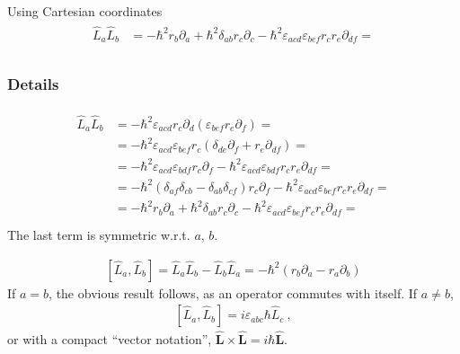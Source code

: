 \documentclass[letterpaper,10pt,english]{jupyterBook}
\begin{document}
\sphinxAtStartPar
{} Using Cartesian coordinates
\begin{equation*}
\begin{split}\begin{aligned}
  \hat{L}_a \hat{L}_b 
  & = - \hbar^2 r_b \partial_a + \hbar^2 \delta_{ab} r_c \partial_c - \hbar^2 \varepsilon_{acd} \varepsilon_{bef} r_c r_e \partial_{df} = \\
\end{aligned}\end{split}
\end{equation*}\subsubsection*{Details}
\begin{equation*}
\begin{split}\begin{aligned}
  \hat{L}_a \hat{L}_b 
  & = - \hbar^2 \varepsilon_{acd} r_c \partial_d \left( \varepsilon_{bef} r_e \partial_f \right) = \\
  & = - \hbar^2 \varepsilon_{acd} \varepsilon_{bef} r_c \left( \delta_{de} \partial_f + r_e \partial_{df} \right) = \\
  & = - \hbar^2 \varepsilon_{acd} \varepsilon_{bdf} r_c \partial_f - \hbar^2 \varepsilon_{acd} \varepsilon_{bdf} r_c r_e \partial_{df} = \\
  & = - \hbar^2 \left( \delta_{af} \delta_{cb} - \delta_{ab} \delta_{cf} \right) r_c \partial_f - \hbar^2 \varepsilon_{acd} \varepsilon_{bef} r_c r_e \partial_{df} = \\
  & = - \hbar^2 r_b \partial_a + \hbar^2 \delta_{ab} r_c \partial_c - \hbar^2 \varepsilon_{acd} \varepsilon_{bef} r_c r_e \partial_{df} = \\
\end{aligned}\end{split}
\end{equation*}
\sphinxAtStartPar
The last term is symmetric w.r.t. \(a\), \(b\).

\sphinxAtStartPar
{}
\begin{equation*}
\begin{split}[ \hat{L}_a, \hat{L}_b ] = \hat{L}_a \hat{L}_b -  \hat{L}_b \hat{L}_a = - \hbar^2 ( r_b\partial_a - r_a \partial_b) \end{split}
\end{equation*}
\sphinxAtStartPar
If \(a = b\), the obvious result follows, as an operator commutes with itself. If \(a \ne b\),
\begin{equation*}
\begin{split}[\hat{L}_a, \hat{L}_b ] = i \varepsilon_{abc} \hbar \hat{L}_c \ ,\end{split}
\end{equation*}
\sphinxAtStartPar
or with a compact “vector notation”, \(\hat{\mathbf{L}} \times \hat{\mathbf{L}} = i \hbar \hat{\mathbf{L}}\).
\end{document}
